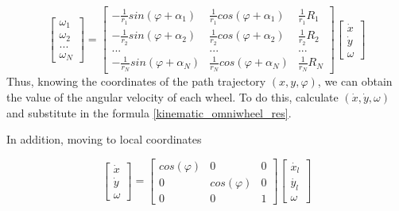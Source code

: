 \documentclass[oneside,final,14pt]{extreport}
\begin{document}
\begin{equation}
\label{kinematic_omniwheel_res}
\begin{bmatrix}
\omega_{1} \\
\omega_{2} \\
... \\
\omega_{N}
\end{bmatrix}
=
\begin{bmatrix}
- \frac{1}{r_{1}} sin (\varphi + \alpha_{1}) &
\frac{1}{r_{1}} cos (\varphi + \alpha_{1}) &
\frac{1}{r_{1}} R_{1}
\\
- \frac{1}{r_{2}} sin (\varphi + \alpha_{2}) &
\frac{1}{r_{2}} cos (\varphi + \alpha_{2}) &
\frac{1}{r_{2}} R_{2}
\\
... & ... & ...
\\
- \frac{1}{r_{N}} sin (\varphi + \alpha_{N}) &
\frac{1}{r_{N}} cos (\varphi + \alpha_{N}) &
\frac{1}{r_{N}} R_{N}
\end{bmatrix}
\begin{bmatrix}
\dot{x} \\
\dot{y} \\
\omega
\end{bmatrix}
\end{equation}
Thus, knowing the coordinates of the path trajectory $ (x, y, \varphi) $, we can obtain the value of the angular velocity of each wheel. To do this, calculate $ (\dot{x}, \dot{y}, \omega) $ and substitute in the formula \ref{kinematic_omniwheel_res}.

In addition, moving to local coordinates

\begin{equation}
\begin{bmatrix}
\dot{x} \\
\dot{y} \\
\omega
\end{bmatrix}
=
\begin{bmatrix}
cos (\varphi) & 0 & 0 \\
0 & cos (\varphi) & 0 \\
0 & 0 & 1
\end{bmatrix}
\begin{bmatrix}
\dot{x_{l}} \\
\dot{y_{l}} \\
\omega
\end{bmatrix}
\end{equation}
\end{document}
